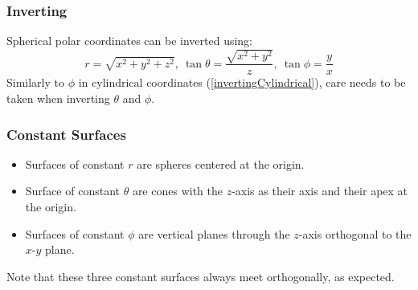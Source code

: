 \documentclass[../main.tex]{subfiles}
\begin{document}
\subsubsection{Inverting}
Spherical polar coordinates can be inverted using:
\[
  r = \sqrt{x^2 + y^2 + z^2},\ \tan \theta = \frac{\sqrt{x^2 + y^2}}{z},\ \tan \phi = \frac{y}{x}
\]
Similarly to $\phi$ in cylindrical coordinates (\cref{invertingCylindrical}), care needs to be taken when inverting $\theta$ and $\phi$.
\subsubsection{Constant Surfaces}
\begin{itemize}
  \item Surfaces of constant $r$ are spheres centered at the origin.
  \item Surface of constant $\theta$ are cones with the $z$-axis as their axis and their apex at the origin.
  \item Surfaces of constant $\phi$ are vertical planes through the $z$-axis orthogonal to the $x$-$y$ plane.
\end{itemize}
Note that these three constant surfaces always meet orthogonally, as expected.
\end{document}
